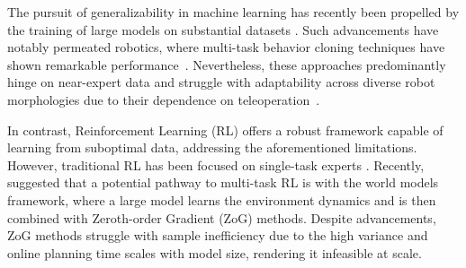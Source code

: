 \documentclass{article} %
\begin{document}

The pursuit of generalizability in machine learning has recently been propelled by the training of large models on substantial datasets \citet{brown2020language,kirillov2023segment,bommasani2021opportunities}. Such advancements have notably permeated robotics, where multi-task behavior cloning techniques have shown remarkable performance~\citet{brohan2023rt,team2023octo, goyal2023rvt,bousmalis2023robocat}. Nevertheless, these approaches predominantly hinge on near-expert data and struggle with adaptability across diverse robot morphologies due to their dependence on teleoperation~\citet{brohan2023rt,team2023octo,kumar2021should}.

In contrast, Reinforcement Learning (RL) offers a robust framework capable of learning from suboptimal data, addressing the aforementioned limitations. However, traditional RL has been focused on single-task experts \citet{mnih2013playing,schulman2017proximal,haarnoja2018soft}. Recently, \citet{hansen2023td} suggested that a potential pathway to multi-task RL is with the world models framework, where a large model learns the environment dynamics and is then combined with Zeroth-order Gradient (ZoG) methods. Despite advancements, ZoG methods struggle with sample inefficiency due to the  high variance \citet{mohamed2020monte,suh2022differentiable,parmas2023model} and online planning time scales with model size, rendering it infeasible at scale.
\end{document}
